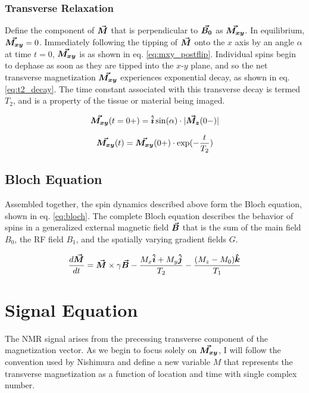 \subsubsection{Transverse Relaxation}
Define the component of $\bm{\vec{M}}$ that is perpendicular to $\bm{\vec{B_0}}$ as $\bm{\vec{M_{xy}}}$. In equilibrium,
$\bm{\vec{M_{xy}}} = 0$.  Immediately following the tipping of $\bm{\vec{M}}$ onto the $x$ axis by an angle $\alpha$ at
time $t=0$, $\bm{\vec{M_{xy}}}$ is as shown in eq. \ref{eq:mxy_postflip}. Individual spins begin to dephase as soon as they
are tipped into the $x$-$y$ plane, and so the net transverse magnetization $\bm{\vec{M_{xy}}}$ experiences exponential
decay, as shown in eq. \ref{eq:t2_decay}. The time constant associated with this transverse decay is termed $T_2$, and
is a property of the tissue or material being imaged.

\begin{equation}\label{eq:mxy_postflip}
    \bm{\vec{M_{xy}}}(t=0+) = \bm{\hat{i}}\sin(\alpha) \cdot |\bm{\vec{M_z}}(0-)|
\end{equation}

\begin{equation}\label{eq:t2_decay}
    \bm{\vec{M_{xy}}}(t) = \bm{\vec{M_{xy}}}(0+) \cdot \exp(-\frac{t}{T_2})
\end{equation}

\subsection{Bloch Equation}
Assembled together, the spin dynamics described above form the Bloch equation, shown in eq. \ref{eq:bloch}. The complete
Bloch equation describes the behavior of spins in a generalized external magnetic field $\bm{\vec{B}}$ that is the sum of
the main field $B_0$, the RF field $B_1$, and the spatially varying gradient fields $G$. 

\begin{equation}\label{eq:bloch}
    \frac{d \bm{\vec{M}}}{dt} = \bm{\vec{M}} \times \gamma \bm{\vec{B}} - \frac{M_x \bm{\hat{i}} + M_y \bm{\hat{j}}}{T_2} - \frac{(M_z - M_0)
    \bm{\hat{k}}}{T_1}
\end{equation}

\section{Signal Equation}
The NMR signal arises from the precessing transverse component of the magnetization vector. As we begin to focus solely
on $\bm{\vec{M_{xy}}}$, I will follow the convention used by Nishimura \cite{nishimura} and define a new variable $M$ that
represents the transverse magnetization as a function of location and time with single complex number.

